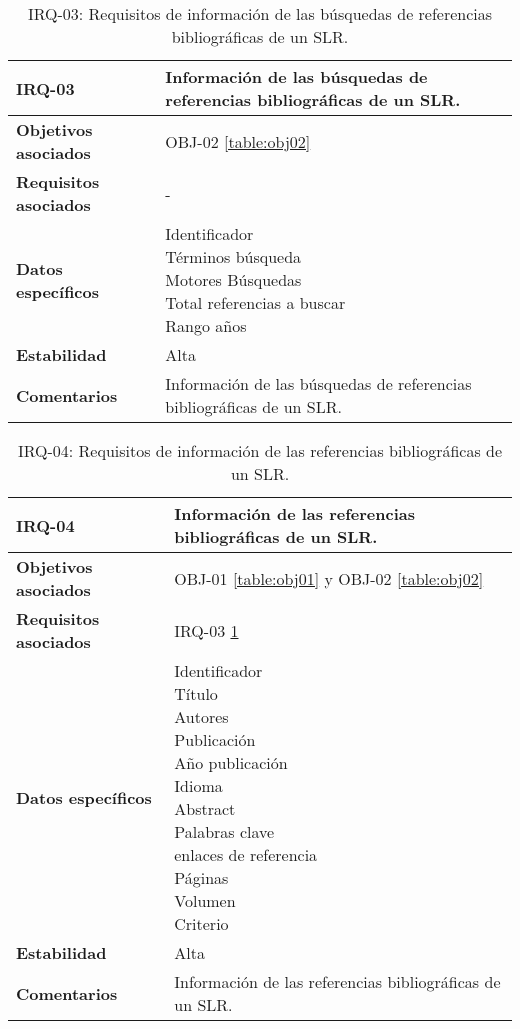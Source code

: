 \begin{table}[!hbt]
	\begin{center}
		\begin{tabular}{|p{5cm}|p{10cm}|}
			\hline
			\textbf{IRQ-03} & Información de las búsquedas de referencias bibliográficas de un SLR.\\
			\hline
			\textbf{Objetivos asociados} & OBJ-02 \ref{table:obj02}\\
			\hline
			\textbf{Requisitos asociados} & -\\
			\hline
			\textbf{Datos específicos} & \shortstack[l]{Identificador \\ Términos búsqueda \\ Motores Búsquedas \\ Total referencias a buscar \\ Rango años} \\
			\hline
			\textbf{Estabilidad} & Alta\\
			\hline
			\textbf{Comentarios} & Información de las búsquedas de referencias bibliográficas de un SLR.\\
			\hline
		\end{tabular}
		\caption{IRQ-03: Requisitos de información de las búsquedas de referencias bibliográficas de un SLR.}
		\label{table:irq03}
	\end{center}
\end{table}

\begin{table}[!hbt]
	\begin{center}
		\begin{tabular}{|p{5cm}|p{10cm}|}
			\hline
			\textbf{IRQ-04} & Información de las referencias bibliográficas de un SLR.\\
			\hline
			\textbf{Objetivos asociados} & OBJ-01 \ref{table:obj01} y OBJ-02 \ref{table:obj02}\\
			\hline
			\textbf{Requisitos asociados} & IRQ-03 \ref{table:irq03}\\
			\hline
			\textbf{Datos específicos} & \shortstack[l]{Identificador \\ Título \\ Autores \\ Publicación \\ Año publicación \\ Idioma \\ Abstract \\ Palabras clave \\ enlaces de referencia \\ Páginas \\ Volumen \\ Criterio} \\
			\hline
			\textbf{Estabilidad} & Alta\\
			\hline
			\textbf{Comentarios} & Información de las referencias bibliográficas de un SLR.\\
			\hline
		\end{tabular}
		\caption{IRQ-04: Requisitos de información de las referencias bibliográficas de un SLR.}
		\label{table:irq04}
	\end{center}
\end{table}

